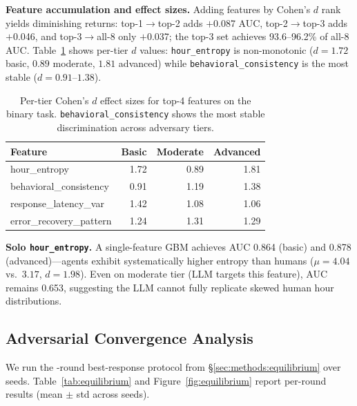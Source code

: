 \documentclass[sigconf,nonacm=false]{acmart}
\begin{document}
\noindent\textbf{Feature accumulation and effect sizes.}
Adding features by Cohen's $d$ rank yields diminishing returns: top-1$\to$top-2 adds $+$0.087 AUC, top-2$\to$top-3 adds $+$0.046, and top-3$\to$all-8 only $+$0.037; the top-3 set achieves 93.6--96.2\% of all-8 AUC.
Table~\ref{tab:tier_effects} shows per-tier $d$ values: \texttt{hour\_entropy} is non-monotonic ($d{=}1.72$ basic, $0.89$ moderate, $1.81$ advanced) while \texttt{behavioral\_consistency} is the most stable ($d{=}0.91$--$1.38$).

\begin{table}[t]
\caption{Per-tier Cohen's $d$ effect sizes for top-4 features on the binary task. \texttt{behavioral\_consistency} shows the most stable discrimination across adversary tiers.}
\label{tab:tier_effects}
\small
\begin{tabular}{lrrr}
\toprule
Feature & Basic & Moderate & Advanced \\
\midrule
hour\_entropy               & 1.72 & 0.89 & 1.81 \\
behavioral\_consistency     & 0.91 & 1.19 & 1.38 \\
response\_latency\_var      & 1.42 & 1.08 & 1.06 \\
error\_recovery\_pattern    & 1.24 & 1.31 & 1.29 \\
\bottomrule
\end{tabular}
\end{table}

\noindent\textbf{Solo \texttt{hour\_entropy}.}
A single-feature GBM achieves AUC 0.864 (basic) and 0.878 (advanced)---agents exhibit systematically higher entropy than humans ($\mu{=}4.04$ vs.\ $3.17$, $d{=}1.98$). Even on moderate tier (LLM targets this feature), AUC remains 0.653, suggesting the LLM cannot fully replicate skewed human hour distributions.

\subsection{Adversarial Convergence Analysis}
\label{sec:equilibrium}

We run the \bestResponseNRounds{}-round best-response protocol from \S\ref{sec:methods:equilibrium} over \bestResponseNSeeds{} seeds. Table~\ref{tab:equilibrium} and Figure~\ref{fig:equilibrium} report per-round results (mean $\pm$ std across seeds).
\end{document}
